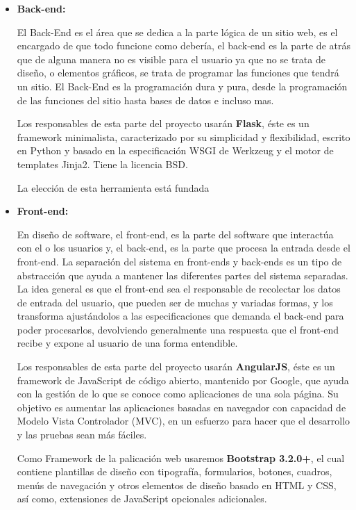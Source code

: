 \begin{itemize}
	\item \textbf{Back-end:} 
    
   El Back-End es el área que se dedica a la parte lógica de un sitio web, es el encargado de que todo funcione como debería, el back-end es la parte de atrás que de alguna manera no es visible para el usuario ya que no se trata de diseño, o elementos gráficos, se trata de programar las funciones que tendrá un sitio. El Back-End es la programación dura y pura, desde la programación de las funciones del sitio hasta bases de datos e incluso mas.


    Los responsables de esta parte del proyecto usarán \textbf{Flask}, éste es un framework minimalista, caracterizado por su simplicidad y flexibilidad, escrito en Python y basado en la especificación WSGI de Werkzeug y el motor de templates Jinja2. Tiene la licencia BSD.
    
    La elección de esta herramienta está fundada
    \item \textbf{Front-end:}
    
     En diseño de software, el front-end, es la parte del software que interactúa con el o los usuarios y, el back-end, es la parte que procesa la entrada desde el front-end. La separación del sistema en front-ends y back-ends es un tipo de abstracción que ayuda a mantener las diferentes partes del sistema separadas. La idea general es que el front-end sea el responsable de recolectar los datos de entrada del usuario, que pueden ser de muchas y variadas formas, y los transforma ajustándolos a las especificaciones que demanda el back-end para poder procesarlos, devolviendo generalmente una respuesta que el front-end recibe y expone al usuario de una forma entendible.
     
    Los responsables de esta parte del proyecto usarán \textbf{AngularJS}, éste es un framework de JavaScript de código abierto, mantenido por Google, que ayuda con la gestión de lo que se conoce como aplicaciones de una sola página. Su objetivo es aumentar las aplicaciones basadas en navegador con capacidad de Modelo Vista Controlador (MVC), en un esfuerzo para hacer que el desarrollo y las pruebas sean más fáciles.
    
    Como Framework de la palicación web usaremos \textbf{Bootstrap 3.2.0+}, el cual contiene plantillas de diseño con tipografía, formularios, botones, cuadros, menús de navegación y otros elementos de diseño basado en HTML y CSS, así como, extensiones de JavaScript opcionales adicionales.
    

\end{itemize}
